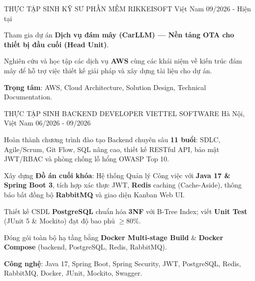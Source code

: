 \begin{cventries}
  \cventry
    {THỰC TẬP SINH KỸ SƯ PHẦN MỀM}
    {RIKKEISOFT}
    {Việt Nam}
    {09/2026 - Hiện tại}
    {
      \begin{cvitems}
        \item {Tham gia dự án \textbf{Dịch vụ đám mây (CarLLM) --- Nền tảng OTA cho thiết bị đầu cuối (Head Unit)}.}
        \item {Nghiên cứu và học tập các dịch vụ \textbf{AWS} cùng các khái niệm về kiến trúc đám mây để hỗ trợ việc thiết kế giải pháp và xây dựng tài liệu cho dự án.}
        \item {\textbf{Trọng tâm}: AWS, Cloud Architecture, Solution Design, Technical Documentation.}
      \end{cvitems}
    }

  \cventry
    {THỰC TẬP SINH BACKEND DEVELOPER}
    {VIETTEL SOFTWARE}
    {Hà Nội, Việt Nam}
    {06/2026 - 09/2026}
    {
      \begin{cvitems}
        \item {Hoàn thành chương trình đào tạo Backend chuyên sâu \textbf{11 buổi}: SDLC, Agile/Scrum, Git Flow, SQL nâng cao, thiết kế RESTful API, bảo mật JWT/RBAC và phòng chống lỗ hổng OWASP Top 10.}
        \item {Xây dựng \textbf{Đồ án cuối khóa}: Hệ thống Quản lý Công việc với \textbf{Java 17 \& Spring Boot 3}, tích hợp xác thực JWT, \textbf{Redis} caching (Cache-Aside), thông báo bất đồng bộ \textbf{RabbitMQ} và giao diện Kanban Web UI.}
        \item {Thiết kế CSDL \textbf{PostgreSQL} chuẩn hóa \textbf{3NF} với B-Tree Index; viết \textbf{Unit Test} (JUnit 5 \& Mockito) đạt độ bao phủ \textbf{$\ge 80\%$}.}
        \item {Đóng gói toàn bộ hạ tầng bằng \textbf{Docker Multi-stage Build} \& \textbf{Docker Compose} (backend, PostgreSQL, Redis, RabbitMQ).}
        \item {\textbf{Công nghệ}: Java 17, Spring Boot, Spring Security, JWT, PostgreSQL, Redis, RabbitMQ, Docker, JUnit, Mockito, Swagger.}
      \end{cvitems}
    }


\end{cventries}

